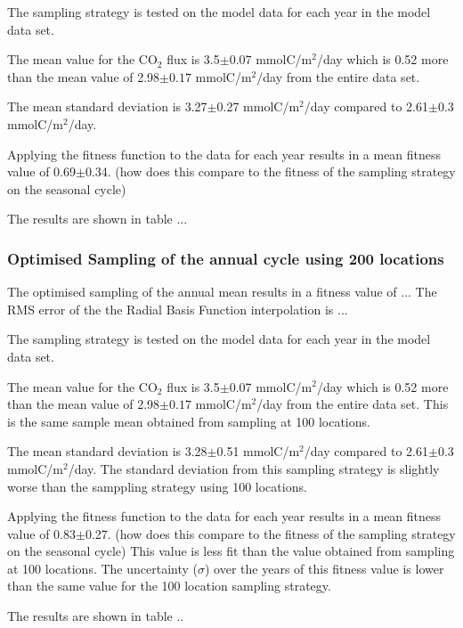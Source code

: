 \documentclass[11pt, a4paper]{article}
\numberwithin{figure}{section}
\numberwithin{table}{section}
\begin{document}
The sampling strategy is tested on the model data for each year in the
model data set.

The mean value for the CO$_2$ flux is 3.5$\pm$0.07 mmolC/m$^2$/day 
which is 0.52 more than the mean value of 2.98$\pm0.17$ mmolC/m$^2$/day
from the entire data set.

The mean standard deviation is 3.27$\pm$0.27 mmolC/m$^2$/day
compared to 2.61$\pm$0.3 mmolC/m$^2$/day.

Applying the fitness function to the data for each year results in a
mean fitness value of 0.69$\pm$0.34. 
(how does this compare to the fitness of the sampling strategy on the
seasonal cycle) 

The results are shown in table ...



\subsubsection{Optimised Sampling of the annual cycle using 200 locations}
The optimised sampling of the annual mean results in a fitness value
of ...
The RMS error of the the Radial Basis Function interpolation is ...

The sampling strategy is tested on the model data for each year in the
model data set.

The mean value for the CO$_2$ flux is 3.5$\pm$0.07 mmolC/m$^2$/day 
which is 0.52 more than the mean value of 2.98$\pm0.17$ mmolC/m$^2$/day
from the entire data set. This is the same sample mean obtained from 
sampling at 100 locations.

The mean standard deviation is 3.28$\pm$0.51 mmolC/m$^2$/day
compared to 2.61$\pm$0.3 mmolC/m$^2$/day. The standard deviation from 
this sampling strategy is slightly worse than the samppling strategy 
using 100 locations. 

Applying the fitness function to the data for each year results in a
mean fitness value of 0.83$\pm$0.27. 
(how does this compare to the fitness of the sampling strategy on the
seasonal cycle)
This value is less fit than the value obtained from sampling at 100 
locations. The uncertainty ($\sigma$) over the years of this fitness
value is lower than the same value for the 100 location sampling
strategy.

The results are shown in table ..
\end{document}
